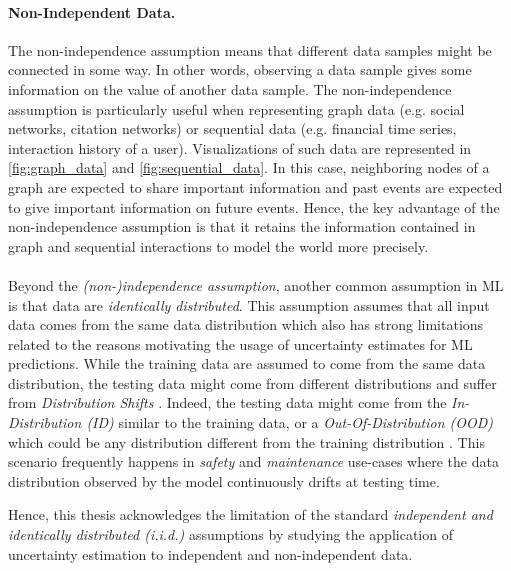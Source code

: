 \paragraph*{Non-Independent Data.} The non-independence assumption means that different data samples might be connected in some way. In other words, observing a data sample gives some information on the value of another data sample.
The non-independence assumption is particularly useful when representing graph data \cite{GNNBook2022} (e.g. social networks, citation networks) or sequential data \cite{shchur2021review, Dietterich2002Machine} (e.g. financial time series, interaction history of a user). Visualizations of such data are represented in \cref{fig:graph_data} and \cref{fig:sequential_data}.
In this case, neighboring nodes of a graph are expected to share important information and past events are expected to give important information on future events.
Hence, the key advantage of the non-independence assumption is that it retains the information contained in graph and sequential interactions to model the world more precisely.

\paragraph*{} Beyond the \emph{(non-)independence assumption}, another common assumption in ML is that data are \emph{identically distributed}. 
This assumption assumes that all input data comes from the same data distribution which also has strong limitations related to the reasons motivating the usage of uncertainty estimates for ML predictions.
While the training data are assumed to come from the same data distribution, the testing data might come from different distributions and suffer from \emph{Distribution Shifts} \cite{rabanser2019shift, dataset-shift}. 
Indeed, the testing data might come from the \emph{In-Distribution (ID)} similar to the training data, or a \emph{Out-Of-Distribution (OOD)} which could be any distribution different from the training distribution \cite{ood-detection-survey, shen2021ood}.
This scenario frequently happens in \emph{safety} and \emph{maintenance} use-cases where the data distribution observed by the model continuously drifts at testing time. 

Hence, this thesis acknowledges the limitation of the standard \emph{independent and identically distributed (i.i.d.)} assumptions by studying the application of uncertainty estimation to independent and non-independent data.

